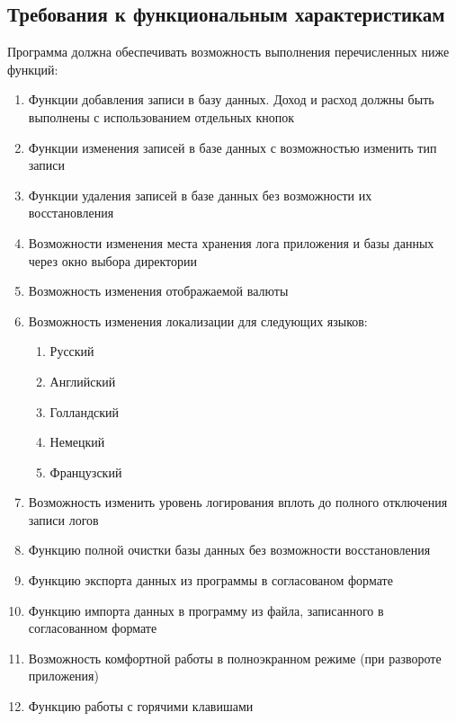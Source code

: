 \subsection{Требования к функциональным характеристикам }
Программа должна обеспечивать возможность выполнения перечисленных ниже функций:
\begin{enumerate}
	\item Функции добавления записи в базу данных. Доход и расход должны быть выполнены с использованием отдельных кнопок
	\item Функции изменения записей в базе данных с возможностью изменить тип записи
	\item Функции удаления записей в базе данных без возможности их восстановления
	\item Возможности изменения места хранения лога приложения и базы данных через окно выбора директории
	\item Возможность изменения отображаемой валюты
	\item Возможность изменения локализации для следующих языков: \begin{enumerate}
		\item Русский
		\item Английский
		\item Голландский
		\item Немецкий
		\item Французский
	\end{enumerate}
	\item Возможность изменить уровень логирования вплоть до полного отключения записи логов
	\item Функцию полной очистки базы данных без возможности восстановления
	\item Функцию экспорта данных из программы в согласованом формате
	\item Функцию импорта данных в программу из файла, записанного в согласованном формате
	\item Возможность комфортной работы в полноэкранном режиме (при развороте приложения)
	\item Функцию работы с горячими клавишами	
\end{enumerate}

